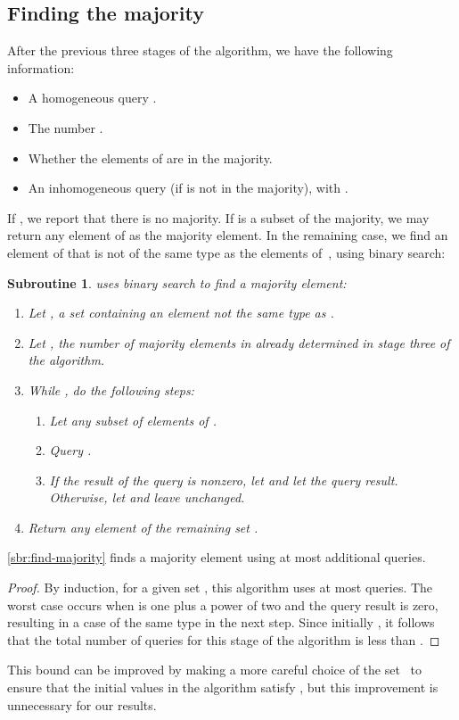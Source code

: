 \documentclass[11pt]{llncs}
\newtheorem{subroutine}{Subroutine}
\begin{document}
\subsection{Finding the majority}

After the previous three stages of the algorithm, we have the following information:
\begin{itemize}
\item A homogeneous query .
\item The number .
\item Whether the elements of  are in the majority.
\item An inhomogeneous query  (if  is not in the majority), with .
\end{itemize}

If , we report that there is no majority. If  is a subset of the majority, we may return any element of  as the majority element. In the remaining case, we find an element of  that is not of the same type as the elements of~, using binary search:

\begin{subroutine} uses binary search to find a majority element:
\label{sbr:find-majority}
\begin{enumerate}
\item Let , a set containing an element not the same type as .
\item Let , the number of majority elements in  already determined in stage three of the algorithm.
\item While , do the following steps:
\begin{enumerate}
\item Let any subset of  elements of .
\item Query .
\item If the result of the query is nonzero, let  and let the query result. Otherwise, let  and leave  unchanged.
\end{enumerate}
\item Return any element of the remaining set . 
\end{enumerate}
\end{subroutine}

\ifFull
\begin{lemma}
\autoref{sbr:find-majority} finds a majority element using at most  additional queries.
\end{lemma}
\begin{proof}
\fi
By induction, for a given set , this algorithm uses at most  queries. The worst case occurs when  is one plus a power of two and the query result is zero, resulting in a case of the same type in the next step. Since initially , it follows that the total number of queries for this stage of the algorithm is less than .
\ifFull
\end{proof}
\fi
This bound can be improved by making a more careful choice of the set~ to ensure that the initial values in the algorithm satisfy , but this improvement is unnecessary for our results.
\end{document}
